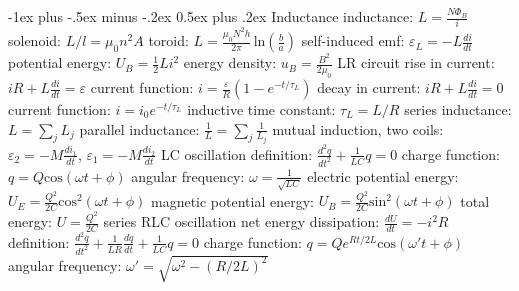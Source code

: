 \documentclass[10pt,landscape]{article}
\makeatletter
\renewcommand{\subsection}{\@startsection{subsection}{2}{0mm}%
                                {-1ex plus -.5ex minus -.2ex}%
                                {0.5ex plus .2ex}%
                                {\normalfont\normalsize\bfseries}}
\newcommand{\spc}{\hspace*{1em}}
\makeatother
\begin{document}
\begin{multicols*}{3}
\subsection{Inductance}
inductance: $L=\frac{N\Phi _B}{i}$
\newline
\spc solenoid: $L/l=\mu _0n^2A$
\newline
\spc toroid: $L=\frac{\mu _0N^2h}{2\pi} \, \mathrm{ln}(\frac{b}{a})$
\newline
self-induced emf: $\varepsilon _L=-L\frac{di}{dt}$
\newline
potential energy: $U_B=\frac{1}{2}Li^2$
\newline
energy density: $u_B=\frac{B^2}{2\mu _0}$
\newline \newline
LR circuit
\newline
\spc rise in current: $iR+L\frac{di}{dt}=\varepsilon $
\newline
\spc\spc current function: $i=\frac{\varepsilon }{R}(1-e^{-t/\tau _L})$
\newline
\spc decay in current: $iR+L\frac{di}{dt}=0$
\newline
\spc\spc current function: $i=i_0e^{-t/\tau _L}$
\newline
\spc inductive time constant: $\tau _L=L/R$
\newline \newline
series inductance: $L=\sum _j L_j$
\newline
parallel inductance: $\frac{1}{L}=\sum _j \frac{1}{L_j}$
\newline
mutual induction, two coils: 
\newline
\spc $\varepsilon _2=-M\frac{di_1}{dt}$, $\varepsilon _1=-M\frac{di_2}{dt}$
\newline \newline
LC oscillation
\newline
\spc definition: $\frac{d^2q}{dt^2}+\frac{1}{LC}q=0$
\newline
\spc\spc charge function: $q=Q\mathrm{cos}(\omega t+\phi)$
\newline
\spc angular frequency: $\omega =\frac{1}{\sqrt{LC}}$
\newline
\spc electric potential energy: $U_E=\frac{Q^2}{2C}\mathrm{cos}^2(\omega t+\phi)$
\newline
\spc magnetic potential energy: $U_B=\frac{Q^2}{2C}\mathrm{sin}^2(\omega t+\phi)$
\newline
\spc total energy: $U=\frac{Q^2}{2C}$
\newline \newline
series RLC oscillation
\newline
\spc net energy dissipation: $\frac{dU}{dt}=-i^2R$
\newline
\spc definition: $\frac{d^2q}{dt^2}+\frac{1}{LR}\frac{dq}{dt}+\frac{1}{LC}q=0$
\newline
\spc \spc charge function: $q=Qe^{Rt/2L}\mathrm{cos}(\omega 't+\phi)$
\newline
\spc angular frequency: $\omega '=\sqrt{\omega ^2-(R/2L)^2}$


\end{multicols*}
\end{document}
